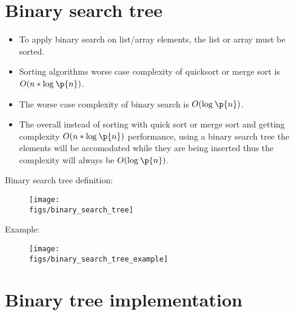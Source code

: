\section{Binary search tree}
\begin{itemize}
    \item To apply binary search on list/array elements, the list or array must be sorted.
    \item Sorting algorithms worse case complexity of quicksort or merge sort is $O(n*\log_{}\p{ n } )$.
    \item The worse case complexity of binary search is $O(\log_{}\p{ n } )$.
    \item The overall instead of sorting with quick sort or merge sort and getting complexity $O(n*\log_{}\p{ n } )$ performance, using a binary search tree the elements will be accomodated while they are being inserted thus the complexity will always be $O(\log_{}\p{ n } )$.
\end{itemize}
Binary search tree definition: 
\begin{figure}[H]
    \centering
    \texttt{[image: \\figs/binary\_search\_tree]}
\end{figure}
Example: 
\begin{figure}[H]
    \centering
    \texttt{[image: \\figs/binary\_search\_tree\_example]}
\end{figure}

\section{Binary tree implementation}
